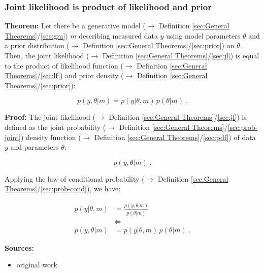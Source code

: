 \documentclass[a4paper,12pt,twoside]{book}
\begin{document}
\subsubsection[\textbf{Joint likelihood is product of likelihood and prior}]{Joint likelihood is product of likelihood and prior} \label{sec:jl-lfnprior}
\setcounter{equation}{0}

\textbf{Theorem:} Let there be a generative model ($\rightarrow$ Definition \ref{sec:General Theorems}/\ref{sec:gm}) $m$ describing measured data $y$ using model parameters $\theta$ and a prior distribution ($\rightarrow$ Definition \ref{sec:General Theorems}/\ref{sec:prior}) on $\theta$. Then, the joint likelihood ($\rightarrow$ Definition \ref{sec:General Theorems}/\ref{sec:jl}) is equal to the product of likelihood function ($\rightarrow$ Definition \ref{sec:General Theorems}/\ref{sec:lf}) and prior density ($\rightarrow$ Definition \ref{sec:General Theorems}/\ref{sec:prior}):

\begin{equation} \label{eq:jl-lfnprior-jl}
p(y,\theta|m) = p(y|\theta,m) \, p(\theta|m) \; .
\end{equation}


\vspace{1em}
\textbf{Proof:} The joint likelihood ($\rightarrow$ Definition \ref{sec:General Theorems}/\ref{sec:jl}) is defined as the joint probability ($\rightarrow$ Definition \ref{sec:General Theorems}/\ref{sec:prob-joint}) density function ($\rightarrow$ Definition \ref{sec:General Theorems}/\ref{sec:pdf}) of data $y$ and parameters $\theta$:

\begin{equation} \label{eq:jl-lfnprior-jl-def}
p(y,\theta|m) \; .
\end{equation}

Applying the law of conditional probability ($\rightarrow$ Definition \ref{sec:General Theorems}/\ref{sec:prob-cond}), we have:

\begin{equation} \label{eq:jl-lfnprior-jl-qed}
\begin{split}
p(y|\theta,m) &= \frac{p(y,\theta|m)}{p(\theta|m)} \\
&\Leftrightarrow \\
p(y,\theta|m) &= p(y|\theta,m) \, p(\theta|m) \; .
\end{split}
\end{equation}


\vspace{1em}
\textbf{Sources:}
\begin{itemize}
\item original work\end{itemize}
\end{document}
